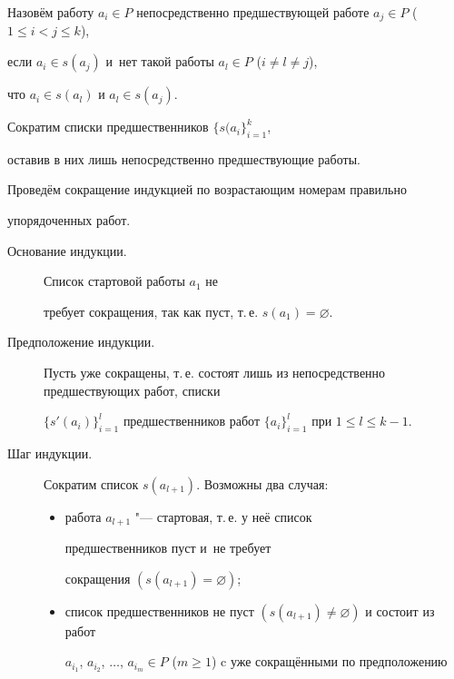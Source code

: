 
Назовём работу $a_i\in P$ непосредственно предшествующей работе $a_{j}\in P$ ($1\leq i<j\leq k$),

если $a_i\in s(a_{j})$ и~нет такой работы $a_{l}\in P$ ($i\neq l\neq j$), 

что $a_i\in s(a_{l})$ и $a_{l}\in s(a_{j})$. 

Сократим списки предшественников $\{s(a_i\}^{k}_{i=1}$, 

оставив в них лишь непосредственно предшествующие работы. 

Проведём сокращение индукцией по возрастающим номерам  правильно

упорядоченных работ.



\begin{description}

\item[{\sf Основание индукции.}] 

Список стартовой работы $a_1$ не

требует сокращения, так как пуст, т.\,е. $s(a_1)=\varnothing$.



\item[{\sf Предположение индукции.}]

Пусть уже сокращены, т.\,е. состоят лишь из непосредственно предшествующих работ, списки

$\{s'(a_i)\}^{l}_{i=1}$ предшественников  работ $\{a_i\}^{l}_{i=1}$ при $1\leq l\leq k-1$.



\item[{\sf Шаг индукции.}] 

Сократим список $s(a_{l+1})$. Возможны два случая:

\begin{itemize}



\item[a)] работа $a_{l+1}$ "--- стартовая, т.\,е. у  неё список

предшественников пуст  и~не требует

сокращения $(s(a_{l+1})=\varnothing)$;



\item[б)] список предшественников не пуст $(s(a_{l+1})\neq \varnothing)$ и состоит из работ 

$a_{i_1}$, $a_{i_2}$, $\dots$, $a_{i_{m}} \in P$ ($m\geq 1$) c уже сокращёнными по предположению


\end{itemize}
\end{description}

